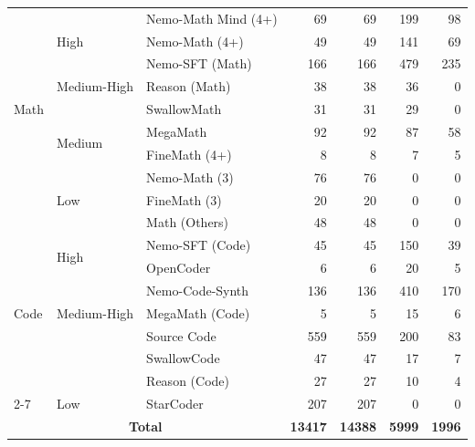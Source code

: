 \begin{table}[htbp]
{\begin{tabular}{lllr|rrr}
\multirow{9}{*}{Math} 
    & \multirow{3}{*}{High} 
      & Nemo-Math Mind (4+) & 69 & 69 & 199 & 98 \\
    & & Nemo-Math (4+) & 49 & 49 & 141 & 69 \\
    & & Nemo-SFT (Math) & 166 & 166 & 479 & 235 \\
    \cmidrule(lr){2-7}
    
    & Medium-High 
      & Reason (Math) & 38 & 38 & 36 & 0 \\
    & & SwallowMath & 31 & 31 & 29 & 0 \\
    \cmidrule(lr){2-7}
    
    & \multirow{2}{*}{Medium} 
      & MegaMath & 92 & 92 & 87 & 58 \\
    & & FineMath (4+) & 8 & 8 & 7 & 5 \\
    \cmidrule(lr){2-7}
    
    & \multirow{3}{*}{Low} 
      & Nemo-Math (3) & 76 & 76 & 0 & 0\\
    & & FineMath (3) & 20 & 20 & 0 & 0\\
    & & Math (Others) & 48 & 48 & 0 & 0\\
\midrule

\multirow{7}{*}{Code} 
    & \multirow{2}{*}{High} 
      & Nemo-SFT (Code) & 45 & 45 & 150 & 39 \\
    & & OpenCoder & 6 & 6 & 20 & 5 \\
    \cmidrule(lr){2-7}
    
    & \multirow{3}{*}{Medium-High} 
      & Nemo-Code-Synth & 136 & 136 & 410 & 170 \\
    & & MegaMath (Code) & 5 & 5 & 15 & 6 \\
    \cmidrule(lr){2-7}
    
    & Medium 
      & Source Code & 559 & 559 & 200 & 83 \\
    & & SwallowCode & 47 & 47 & 17 & 7 \\
    & & Reason (Code) & 27 & 27 & 10 & 4 \\
    \cmidrule(lr){2-7}
    
    & Low 
      & StarCoder & 207 & 207 & 0 & 0 \\
\midrule
\multicolumn{3}{c}{\textbf{Total}} & \textbf{13417} & \textbf{14388} & \textbf{5999} & \textbf{1996} \\
      
\bottomrule
\end{tabular}
}
\end{table}
